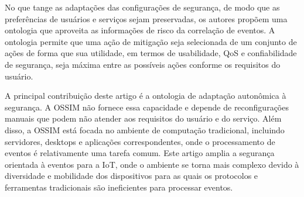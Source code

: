 \documentclass[tid,table]{texufpel} %
\begin{document}
No que tange as adaptações das configurações de segurança, de modo que as preferências de usuários e serviços sejam preservadas, os autores propõem uma ontologia que aproveita as informações de risco da correlação de eventos. A ontologia permite que uma ação de mitigação seja selecionada de um conjunto de ações de forma que sua utilidade, em termos de usabilidade, QoS e confiabilidade de segurança, seja máxima entre as possíveis ações conforme os requisitos do usuário.


A principal contribuição deste artigo é a ontologia de adaptação autonômica à segurança. A OSSIM não fornece essa capacidade e depende de reconfigurações manuais que podem não atender aos requisitos do usuário e do serviço. Além disso, a OSSIM está focada no ambiente de computação tradicional, incluindo servidores, desktops e aplicações correspondentes, onde o processamento de eventos é relativamente uma tarefa comum. Este artigo amplia a segurança orientada à eventos para a IoT, onde o ambiente se torna mais complexo devido à diversidade e mobilidade dos dispositivos para as quais os protocolos e ferramentas tradicionais são ineficientes para processar eventos.
\end{document}
